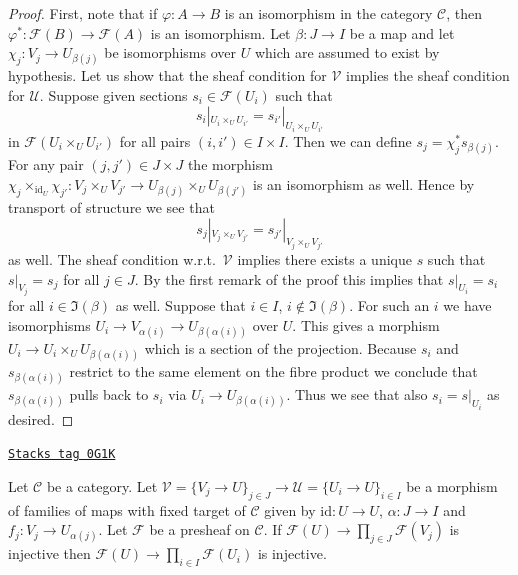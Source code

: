 \begin{proof}
First, note that if $\varphi : A \to B$ is an isomorphism in the
category $\mathcal{C}$, then $\varphi^* : \mathcal{F}(B) \to \mathcal{F}(A)$
is an isomorphism. Let $\beta : J \to I$ be a map and let
$\chi_j : V_j \to U_{\beta(j)}$ be isomorphisms over $U$ which
are assumed to exist by hypothesis. Let us show that the sheaf
condition for $\mathcal{V}$ implies the sheaf condition for $\mathcal{U}$.
Suppose given sections $s_i \in \mathcal{F}(U_i)$ such that
$$
s_i|_{U_i \times_U U_{i'}} = s_{i'}|_{U_i \times_U U_{i'}}
$$
in $\mathcal{F}(U_i \times_U U_{i'})$ for all pairs $(i, i') \in I \times I$.
Then we can define $s_j = \chi_j^*s_{\beta(j)}$. For any pair
$(j, j') \in J \times J$ the morphism
$\chi_j \times_{\text{id}_U} \chi_{j'} : V_j \times_U V_{j'} \to
U_{\beta(j)} \times_U U_{\beta(j')}$ is an isomorphism as well.
Hence by transport of structure we see that
$$
s_j|_{V_j \times_U V_{j'}} = s_{j'}|_{V_j \times_U V_{j'}}
$$
as well. The sheaf condition w.r.t.\ $\mathcal{V}$ implies there
exists a unique $s$ such that $s|_{V_j} = s_j$ for all $j \in J$.
By the first remark of the proof this implies that $s|_{U_i} = s_i$
for all $i \in \Im(\beta)$ as well. Suppose that $i \in I$,
$i \not \in \Im(\beta)$. For such an $i$ we have isomorphisms
$U_i \to V_{\alpha(i)} \to U_{\beta(\alpha(i))}$ over $U$. This gives a
morphism $U_i \to U_i \times_U U_{\beta(\alpha(i))}$ which is a
section of the projection. Because $s_i$ and $s_{\beta(\alpha(i))}$
restrict to the same element on the fibre product we conclude that
$s_{\beta(\alpha(i))}$ pulls back to $s_i$ via $U_i \to U_{\beta(\alpha(i))}$.
Thus we see that also $s_i = s|_{U_i}$ as desired.
\end{proof}

\begin{lemma}
\label{sites-lemma-compare-separated-presheaf-condition}
\href{https://stacks.math.columbia.edu/tag/0G1K}{\texttt{Stacks tag 0G1K}}

Let $\mathcal{C}$ be a category. Let $\mathcal{V} = \{V_j \to U\}_{j \in J} \to
\mathcal{U} = \{U_i \to U\}_{i \in I}$ be a morphism of families of maps
with fixed target of $\mathcal{C}$ given by $\text{id} : U \to U$,
$\alpha : J \to I$ and $f_j : V_j \to U_{\alpha(j)}$. Let $\mathcal{F}$
be a presheaf on $\mathcal{C}$. If
$\mathcal{F}(U) \to \prod_{j \in J} \mathcal{F}(V_j)$ is
injective then
$\mathcal{F}(U) \to \prod_{i \in I} \mathcal{F}(U_i)$ is
injective.
\end{lemma}

